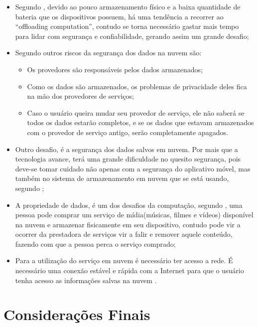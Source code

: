 \documentclass[12pt]{article}
\begin{document}
\begin{itemize}
 \item Segundo \cite{kumar2014}, devido ao pouco armazenamento físico e a baixa quantidade de bateria que os dispositivos
 possuem, há uma tendência a recorrer ao “offloading computation”, contudo se torna necessário gastar mais tempo para lidar com
 segurança e confiabilidade, gerando assim um grande desafio;

  \item Segundo \cite{gao13} outros riscos da segurança dos dados na nuvem são:

    \begin{itemize}
      \item Os provedores são responsáveis pelos dados armazenados;
      \item Como os dados são armazenados, os problemas de privacidade deles fica na mão dos provedores de serviços;
      \item Caso o usuário queira mudar seu provedor de serviço, ele não saberá se todos os dados estarão completos, e se os
      dados que estavam armazenados com o provedor de serviço antigo, serão completamente apagados.
    \end{itemize}

 
 \item Outro desafio, é a segurança dos dados salvos em nuvem. Por mais que a tecnologia avance, terá uma grande dificuldade no
 quesito segurança, pois deve-se tomar cuidado não apenas com a segurança do aplicativo móvel, mas também no sistema de
 armazenamento em nuvem que se está usando, segundo \cite{kumar2014};
 
 \item A propriedade de dados, é um dos desafios da computação, segundo \cite{alizadeh2013}, uma pessoa pode comprar um serviço 
 de mídia(músicas, filmes e vídeos) disponível na nuvem e armazenar fisicamente em seu dispositivo, contudo pode vir a ocorrer da
 prestadora de serviços vir a falir e remover aquele conteúdo, fazendo com que a pessoa perca o serviço comprado;
 
 \item Para a utilização do serviço em nuvem é necessário ter acesso a rede. É necessário uma conexão estável e rápida com a
 Internet para que o usuário tenha acesso as informações salvas na nuvem \cite{alizadeh2013}.
 
\end{itemize}


\section{Considerações Finais}



\end{document}
